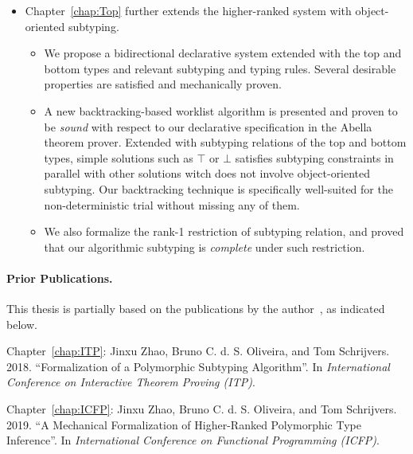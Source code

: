 \begin{itemize}
  \item Chapter~\ref{chap:Top}
    further extends the higher-ranked system with object-oriented subtyping.
    \begin{itemize}
      \item We propose a bidirectional declarative system extended with
        the top and bottom types and relevant subtyping and typing rules.
        Several desirable properties are satisfied and mechanically proven.
      \item A new backtracking-based worklist algorithm is presented and
        proven to be \emph{sound} with respect to our declarative specification
        in the Abella theorem prover.
        Extended with subtyping relations of the top and bottom types,
        simple solutions such as $\top$ or $\bot$ satisfies subtyping constraints
        in parallel with other solutions witch does not involve object-oriented subtyping.
        Our backtracking technique is specifically well-suited for the
        non-deterministic trial without missing any of them.
      \item We also formalize the rank-1 restriction of subtyping relation,
        and proved that our algorithmic subtyping is \emph{complete} under such restriction.
    \end{itemize}
\end{itemize}



\paragraph{Prior Publications.}
This thesis is partially based on the publications by the author~\citep{itp2018,icfp2019},
as indicated below.
\begin{description}
\item Chapter~\ref{chap:ITP}: Jinxu Zhao, Bruno C. d. S. Oliveira, and Tom Schrijvers. 2018.
  ``Formalization of a Polymorphic Subtyping Algorithm''.
  In \emph{International Conference on Interactive Theorem Proving (ITP)}.
\item Chapter~\ref{chap:ICFP}: Jinxu Zhao, Bruno C. d. S. Oliveira, and Tom Schrijvers. 2019.
  ``A Mechanical Formalization of Higher-Ranked Polymorphic Type Inference''.
  In \emph{International Conference on Functional Programming (ICFP)}.
\end{description}

